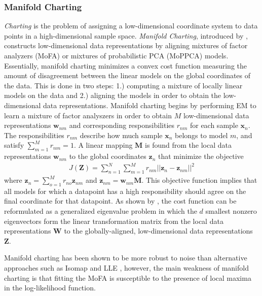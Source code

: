\subsubsection{Manifold Charting} \label{sec:Manifold_Charting}
\textit{Charting} is the problem of assigning a low-dimensional coordinate system to data points in a high-dimensional sample space. \textit{Manifold Charting}, introduced by \cite{Brand2003ManifoldCharting}, constructs low-dimensional data representations by aligning mixtures of factor analyzers (MoFA) or mixtures of probabilistic PCA (MoPPCA) models.  Essentially, manifold charting minimizes a convex cost function measuring the amount of disagreement between the linear models on the global coordinates of the data. This is done in two steps: 1.) computing a mixture of locally linear models on the data and 2.) aligning the models in order to obtain the low-dimensional data representations.   Manifold charting begins by performing EM to learn a mixture of factor analyszers in order to obtain $M$ low-dimensional data representations $\bm{w}_{nm}$ and corresponding responsibilities $r_{nm}$ for each sample $\bm{x}_{n}$.  The responsibilities  $r_{nm}$ describe how much sample $\bm{x}_{n}$ belongs to model $m$, and satisfy $\sum_{m=1}^{M}r_{nm}=1$.  A linear mapping $\bm{M}$ is found from the local data representations $\bm{w}_{nm}$ to the global coordinates $\bm{z}_{n}$ that minimize the objective 
\begin{align}
	J(\bm{Z}) = \sum_{n=1}^{N}\sum_{m=1}^{M} r_{nm} ||\bm{z}_{n} - \bm{z}_{nm} ||^{2}
\end{align} 
\noindent
where $\bm{z}_{n} = \sum_{o=1}^{M}r_{no}\bm{z}_{nm}$ and $\bm{z}_{nm} = \bm{w}_{nm}\bm{M}$.  This objective function implies that all models for which a datapoint has a high responsibility should agree on the final coordinate for that datapoint.  As shown by \cite{VanDerMaaten2009DRReview}, the cost function can be reformulated as a generalized eigenvalue problem in which the $d$ smallest nonzero eigenvectors form the linear transformation matrix from the local data representations $\bm{W}$ to the globally-aligned, low-dimensional data representations $\bm{Z}$.

Manifold charting has been shown to be more robust to noise than alternative approaches such as Isomap and LLE \citep{Brand2003ManifoldCharting}, however, the main weakness of manifold charting is that fitting the MoFA is susceptible to the presence of local maxima in the log-likelihood function.



